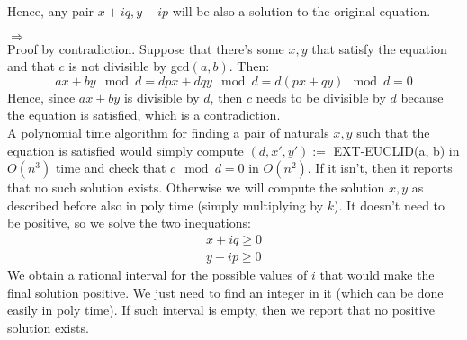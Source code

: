 \documentclass{article}
\begin{document}
Hence, any pair $x+iq, y-ip$ will be also a solution to the original equation.

$\Longrightarrow$ \\

Proof by contradiction. Suppose that there's some $x, y$ that satisfy the equation and that $c$ is not divisible by gcd$(a, b)$. Then:
$$
ax + by \mod d = dpx + dqy \mod d = d(px + qy) \mod d = 0
$$
Hence, since $ax + by$ is divisible by $d$, then $c$ needs to be divisible by $d$ because the equation is satisfied, which is a contradiction. \\

A polynomial time algorithm for finding a pair of naturals $x, y$ such that the equation is satisfied would simply compute $(d, x', y') := $ EXT-EUCLID(a, b) in $O(n^3)$ time and check that $c \mod d = 0$ in $O(n^2)$. If it isn't, then it reports that no such solution exists. Otherwise we will compute the solution $x, y$ as described before also in poly time (simply multiplying by $k$). It doesn't need to be positive, so we solve the two inequations:
\begin{align*}
x + iq \ge 0 \\
y - ip \ge 0
\end{align*}
We obtain a rational interval for the possible values of $i$ that would make the final solution positive. We just need to find an integer in it (which can be done easily in poly time). If such interval is empty, then we report that no positive solution exists.
\end{document}
